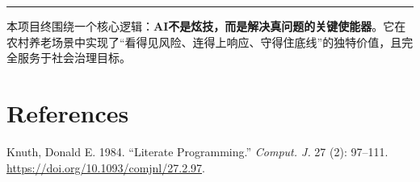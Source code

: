 \documentclass[
  letterpaper,
  DIV=11,
  numbers=noendperiod]{scrreprt}
\newlength{\cslhangindent}
\newenvironment{CSLReferences}[2] %
 {\begin{list}{}{%
  \setlength{\itemindent}{0pt}
  \setlength{\leftmargin}{0pt}
  \setlength{\parsep}{0pt}
  \ifodd #1
   \setlength{\leftmargin}{\cslhangindent}
   \setlength{\itemindent}{-1\cslhangindent}
  \fi
  \setlength{\itemsep}{#2\baselineskip}}}
 {\end{list}}
\begin{document}
\begin{center}\rule{0.5\linewidth}{0.5pt}\end{center}

本项目终围绕一个核心逻辑：\textbf{AI不是炫技，而是解决真问题的关键使能器}。它在农村养老场景中实现了``看得见风险、连得上响应、守得住底线''的独特价值，且完全服务于社会治理目标。


\chapter*{References}\label{references}


\label{refs}
\begin{CSLReferences}{1}{0}
Knuth, Donald E. 1984. {``Literate Programming.''} \emph{Comput. J.} 27
(2): 97--111. \url{https://doi.org/10.1093/comjnl/27.2.97}.

\end{CSLReferences}
\end{document}
